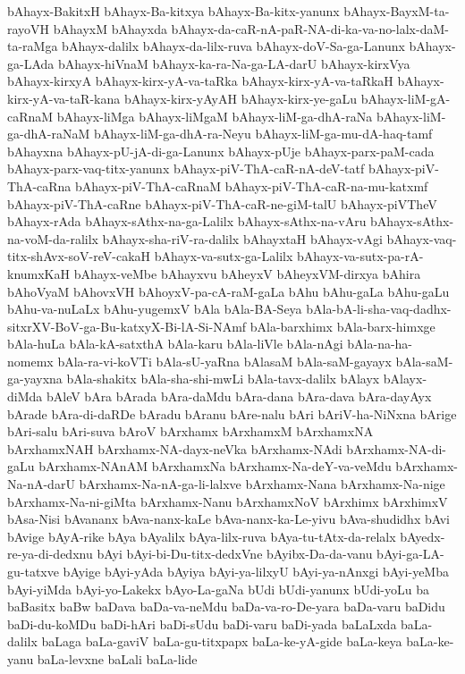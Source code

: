 {bAhayx-BakitxH
bAhayx-Ba-kitxya
bAhayx-Ba-kitx-yanunx
bAhayx-BayxM-ta-rayoVH
bAhayxM
bAhayxda
bAhayx-da-caR-nA-paR-NA-di-ka-va-no-lalx-daM-ta-raMga
bAhayx-dalilx
bAhayx-da-lilx-ruva
bAhayx-doV-Sa-ga-Lanunx
bAhayx-ga-LAda
bAhayx-hiVnaM
bAhayx-ka-ra-Na-ga-LA-darU
bAhayx-kirxVya
bAhayx-kirxyA
bAhayx-kirx-yA-va-taRka
bAhayx-kirx-yA-va-taRkaH
bAhayx-kirx-yA-va-taR-kana
bAhayx-kirx-yAyAH
bAhayx-kirx-ye-gaLu
bAhayx-liM-gA-caRnaM
bAhayx-liMga
bAhayx-liMgaM
bAhayx-liM-ga-dhA-raNa
bAhayx-liM-ga-dhA-raNaM
bAhayx-liM-ga-dhA-ra-Neyu
bAhayx-liM-ga-mu-dA-haq-tamf
bAhayxna
bAhayx-pU-jA-di-ga-Lanunx
bAhayx-pUje
bAhayx-parx-paM-cada
bAhayx-parx-vaq-titx-yanunx
bAhayx-piV-ThA-caR-nA-deV-tatf
bAhayx-piV-ThA-caRna
bAhayx-piV-ThA-caRnaM
bAhayx-piV-ThA-caR-na-mu-katxmf
bAhayx-piV-ThA-caRne
bAhayx-piV-ThA-caR-ne-giM-talU
bAhayx-piVTheV
bAhayx-rAda
bAhayx-sAthx-na-ga-Lalilx
bAhayx-sAthx-na-vAru
bAhayx-sAthx-na-voM-da-ralilx
bAhayx-sha-riV-ra-dalilx
bAhayxtaH
bAhayx-vAgi
bAhayx-vaq-titx-shAvx-soV-reV-cakaH
bAhayx-va-sutx-ga-Lalilx
bAhayx-va-sutx-pa-rA-knumxKaH
bAhayx-veMbe
bAhayxvu
bAheyxV
bAheyxVM-dirxya
bAhira
bAhoVyaM
bAhovxVH
bAhoyxV-pa-cA-raM-gaLa
bAhu
bAhu-gaLa
bAhu-gaLu
bAhu-va-nuLaLx
bAhu-yugemxV
bAla
bAla-BA-Seya
bAla-bA-li-sha-vaq-dadhx-sitxrXV-BoV-ga-Bu-katxyX-Bi-lA-Si-NAmf
bAla-barxhimx
bAla-barx-himxge
bAla-huLa
bAla-kA-satxthA
bAla-karu
bAla-liVle
bAla-nAgi
bAla-na-ha-nomemx
bAla-ra-vi-koVTi
bAla-sU-yaRna
bAlasaM
bAla-saM-gayayx
bAla-saM-ga-yayxna
bAla-shakitx
bAla-sha-shi-mwLi
bAla-tavx-dalilx
bAlayx
bAlayx-diMda
bAleV
bAra
bArada
bAra-daMdu
bAra-dana
bAra-dava
bAra-dayAyx
bArade
bAra-di-daRDe
bAradu
bAranu
bAre-nalu
bAri
bAriV-ha-NiNxna
bArige
bAri-salu
bAri-suva
bAroV
bArxhamx
bArxhamxM
bArxhamxNA
bArxhamxNAH
bArxhamx-NA-dayx-neVka
bArxhamx-NAdi
bArxhamx-NA-di-gaLu
bArxhamx-NAnAM
bArxhamxNa
bArxhamx-Na-deY-va-veMdu
bArxhamx-Na-nA-darU
bArxhamx-Na-nA-ga-li-lalxve
bArxhamx-Nana
bArxhamx-Na-nige
bArxhamx-Na-ni-giMta
bArxhamx-Nanu
bArxhamxNoV
bArxhimx
bArxhimxV
bAsa-Nisi
bAvananx
bAva-nanx-kaLe
bAva-nanx-ka-Le-yivu
bAva-shudidhx
bAvi
bAvige
bAyA-rike
bAya
bAyalilx
bAya-lilx-ruva
bAya-tu-tAtx-da-relalx
bAyedx-re-ya-di-dedxnu
bAyi
bAyi-bi-Du-titx-dedxVne
bAyibx-Da-da-vanu
bAyi-ga-LA-gu-tatxve
bAyige
bAyi-yAda
bAyiya
bAyi-ya-lilxyU
bAyi-ya-nAnxgi
bAyi-yeMba
bAyi-yiMda
bAyi-yo-Lakekx
bAyo-La-gaNa
bUdi
bUdi-yanunx
bUdi-yoLu
ba
baBasitx
baBw
baDava
baDa-va-neMdu
baDa-va-ro-De-yara
baDa-varu
baDidu
baDi-du-koMDu
baDi-hAri
baDi-sUdu
baDi-varu
baDi-yada
baLaLxda
baLa-dalilx
baLaga
baLa-gaviV
baLa-gu-titxpapx
baLa-ke-yA-gide
baLa-keya
baLa-ke-yanu
baLa-levxne
baLali
baLa-lide
}
